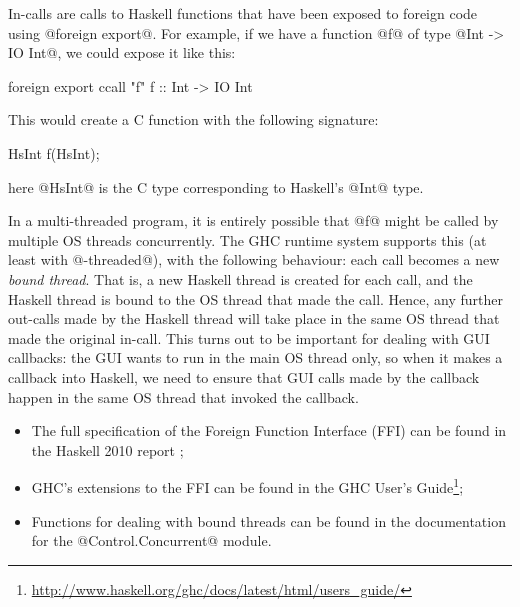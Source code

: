 In-calls are calls to Haskell functions that have been exposed to
foreign code using @foreign export@.  For example, if we have a
function @f@ of type @Int -> IO Int@, we could expose it like this:

\begin{haskell}
foreign export ccall "f" f :: Int -> IO Int
\end{haskell}

\noindent This would create a C function with the following signature:

\begin{haskell}
HsInt f(HsInt);
\end{haskell}

\noindent here @HsInt@ is the C type corresponding to Haskell's @Int@
type.

In a multi-threaded program, it is entirely possible that @f@ might be
called by multiple OS threads concurrently.  The GHC runtime system
supports this (at least with @-threaded@), with the following
behaviour: each call becomes a new \emph{bound thread}.  That is, a
new Haskell thread is created for each call, and the Haskell thread is
bound to the OS thread that made the call.  Hence, any further
out-calls made by the Haskell thread will take place in the same OS
thread that made the original in-call.  This turns out to be important
for dealing with GUI callbacks: the GUI wants to run in the main OS
thread only, so when it makes a callback into Haskell, we need to
ensure that GUI calls made by the callback happen in the same OS
thread that invoked the callback.


\begin{itemize}
\item The full specification of the Foreign Function Interface (FFI)
  can be found in the Haskell 2010 report \cite{haskell2010};
\item GHC's extensions to the FFI can be found in the GHC User's
  Guide\footnote{\url{http://www.haskell.org/ghc/docs/latest/html/users_guide/}};
\item Functions for dealing with bound threads can be found in the
  documentation for the @Control.Concurrent@ module.
\end{itemize}

